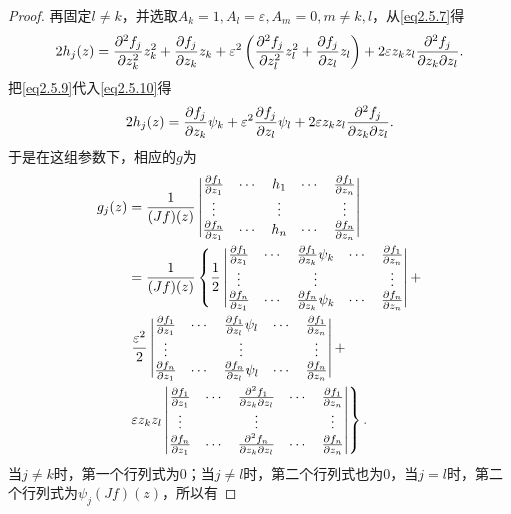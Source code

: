 \begin{proof}
再固定$l\neq k$，并选取$A_k=1,A_l=\varepsilon,A_m=0,m\neq k,l$，从\eqref{eq2.5.7}得
\begin{equation}\label{eq2.5.10}
	2h_j(z)=\frac{\partial^2 f_j}{\partial z_k^2} z_k^2+\frac{\partial f_j}{\partial z_k}z_k+\varepsilon^2\left(\frac{\partial^2 f_j}{\partial z_l^2}z_l^2+\frac{\partial f_j}{\partial z_l}z_l\right)+2\varepsilon z_k z_l \frac{\partial^2 f_j}{\partial z_k\partial z_l}.
\end{equation}
把\eqref{eq2.5.9}代入\eqref{eq2.5.10}得
\[2h_j(z)=\frac{\partial f_j}{\partial z_k}\psi_k+\varepsilon^2 \frac{\partial f_j}{\partial z_l}\psi_l+2\varepsilon z_k z_l \frac{\partial^2 f_j}{\partial z_k\partial z_l}.\]
于是在这组参数下，相应的$g$为
\begin{equation*}
	\begin{aligned}
		g_j(z)
		&=\frac1{(J f)(z)}
		\begin{vmatrix}
			\frac{\partial f_1}{\partial z_1} & \cdots & h_1 & \cdots & \frac{\partial f_1}{\partial z_n}\\
			\vdots &  &\vdots & &\vdots\\
			\frac{\partial f_n}{\partial z_1} & \cdots & h_n & \cdots & \frac{\partial f_n}{\partial z_n} 
		\end{vmatrix}\\
		&=\frac1{(Jf)(z)}\left\{
		\frac12 \begin{vmatrix}
			\frac{\partial f_1}{\partial z_1} &\cdots & \frac{\partial f_1}{\partial z_k}\psi_k & \cdots & \frac{\partial f_1}{\partial z_n}\\
			\vdots & & \vdots & & \vdots\\
			\frac{\partial f_n}{\partial z_1} & \cdots & \frac{\partial f_n}{\partial z_k}\psi_k & \cdots & \frac{\partial f_n}{\partial z_n}
		\end{vmatrix}+\right.\\
		&\left.\frac{\varepsilon^2}{2}\begin{vmatrix}
			\frac{\partial f_1}{\partial z_1} &\cdots & \frac{\partial f_1}{\partial z_l}\psi_l & \cdots & \frac{\partial f_1}{\partial z_n}\\
			\vdots & & \vdots & & \vdots\\
			\frac{\partial f_n}{\partial z_1} & \cdots & \frac{\partial f_n}{\partial z_l}\psi_l & \cdots & \frac{\partial f_n}{\partial z_n}
		\end{vmatrix}+\right.\\
		&\left.\varepsilon z_k z_l\begin{vmatrix}
			\frac{\partial f_1}{\partial z_1} &\cdots & \frac{\partial^2 f_1}{\partial z_k\partial z_l} & \cdots & \frac{\partial f_1}{\partial z_n}\\
			\vdots & & \vdots & & \vdots\\
			\frac{\partial f_n}{\partial z_1} & \cdots & \frac{\partial^2 f_n}{\partial z_k\partial z_l} & \cdots & \frac{\partial f_n}{\partial z_n}
		\end{vmatrix} \right\}.
	\end{aligned}
\end{equation*}
当$j\neq k$时，第一个行列式为$0$；当$j\neq l$时，第二个行列式也为$0$，当$j=l$时，第二个行列式为$\psi_j(Jf)(z)$，所以有

\end{proof}
